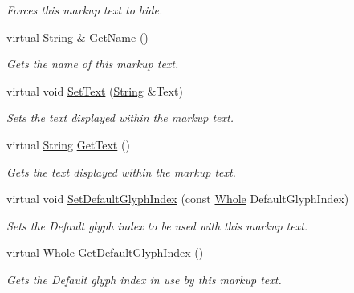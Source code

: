 \begin{DoxyCompactItemize}
\begin{DoxyCompactList}\small\item\em Forces this markup text to hide. \item\end{DoxyCompactList}\item 
virtual \hyperlink{namespacephys_aa03900411993de7fbfec4789bc1d392e}{String} \& \hyperlink{classphys_1_1UI_1_1MarkupText_afa64067f890466ad4844c4836e7667fd}{GetName} ()
\begin{DoxyCompactList}\small\item\em Gets the name of this markup text. \item\end{DoxyCompactList}\item 
virtual void \hyperlink{classphys_1_1UI_1_1MarkupText_af5d9184959b56996e9727e2d7ccf8f22}{SetText} (\hyperlink{namespacephys_aa03900411993de7fbfec4789bc1d392e}{String} \&Text)
\begin{DoxyCompactList}\small\item\em Sets the text displayed within the markup text. \item\end{DoxyCompactList}\item 
virtual \hyperlink{namespacephys_aa03900411993de7fbfec4789bc1d392e}{String} \hyperlink{classphys_1_1UI_1_1MarkupText_af5d8a7e6ca03e15fc488608c28a54c1e}{GetText} ()
\begin{DoxyCompactList}\small\item\em Gets the text displayed within the markup text. \item\end{DoxyCompactList}\item 
virtual void \hyperlink{classphys_1_1UI_1_1MarkupText_a6f0b087fca1b75a5005652ccd31a77a1}{SetDefaultGlyphIndex} (const \hyperlink{namespacephys_a460f6bc24c8dd347b05e0366ae34f34a}{Whole} DefaultGlyphIndex)
\begin{DoxyCompactList}\small\item\em Sets the Default glyph index to be used with this markup text. \item\end{DoxyCompactList}\item 
virtual \hyperlink{namespacephys_a460f6bc24c8dd347b05e0366ae34f34a}{Whole} \hyperlink{classphys_1_1UI_1_1MarkupText_a02872d0b9828b34e9b2ceec82cce237b}{GetDefaultGlyphIndex} ()
\begin{DoxyCompactList}\small\item\em Gets the Default glyph index in use by this markup text. \item\end{DoxyCompactList}\item 

\end{DoxyCompactItemize}
